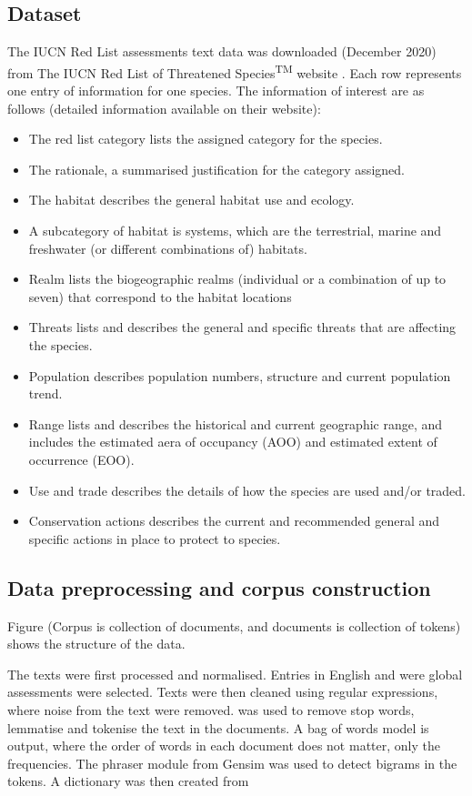 \subsection{Dataset}

The IUCN Red List assessments text data was downloaded (December 2020) from The IUCN Red List of Threatened Species\textsuperscript{TM} website \parencite{iucn2021}. Each row represents one entry of information for one species. The information of interest are as follows (detailed information available on their website):
\begin{itemize}
    \item The red list category lists the assigned category for the species. 
    \item The rationale, a summarised justification for the category assigned. 
    \item The habitat describes the general habitat use and ecology. 
    \item A subcategory of habitat is systems, which are the terrestrial, marine and freshwater (or different combinations of) habitats.
    \item Realm lists the biogeographic realms (individual or a combination of up to seven) that correspond to the habitat locations
    \item Threats lists and describes the general and specific threats that are affecting the species. 
    \item Population describes population numbers, structure and current population trend. 
    \item Range lists and describes the historical and current geographic range, and includes the estimated aera of occupancy (AOO) and estimated extent of occurrence (EOO). 
    \item Use and trade describes the details of how the species are used and/or traded.
    \item Conservation actions describes the current and recommended general and specific actions in place to protect to species. 
\end{itemize}

\subsection{Data preprocessing and corpus construction}

Figure (Corpus is collection of documents, and documents is collection of tokens) shows the structure of the data. 

The texts were first processed and normalised. Entries in English and were global assessments were selected. Texts were then cleaned using regular expressions, where noise from the text were removed. \textcite{spacy} was used to remove stop words, lemmatise and tokenise the text in the documents. A bag of words model is output, where the order of words in each document does not matter, only the frequencies. The phraser module from Gensim \parencite{rehurek_lrec} was used to detect bigrams in the tokens. A dictionary was then created from

